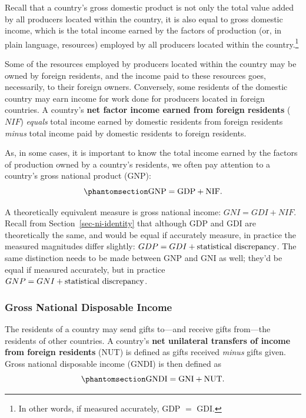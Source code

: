 \documentclass[
  letterpaper,
]{book}
\begin{document}

Recall that a country's gross domestic product is not only the total
value added by all producers located within the country, it is also
equal to gross domestic income, which is the total income earned by the
factors of production (or, in plain language, resources) employed by all
producers located within the country.\footnote{In other words, if
  measured accurately, GDP \(=\) GDI.}

Some of the resources employed by producers located within the country
may be owned by foreign residents, and the income paid to these
resources goes, necessarily, to their foreign owners. Conversely, some
residents of the domestic country may earn income for work done for
producers located in foreign countries. A country's \textbf{net factor
income earned from foreign residents} (\(NIF\)) \emph{equals} total
income earned by domestic residents from foreign residents \emph{minus}
total income paid by domestic residents to foreign residents.

As, in some cases, it is important to know the total income earned by
the factors of production owned by a country's residents, we often pay
attention to a country's gross national product (GNP):
\begin{equation}\phantomsection\label{eq-gnp}{
\hbox{GNP}=\hbox{GDP}+\hbox{NIF}.
}\end{equation}

A theoretically equivalent measure is gross national income:
\(GNI=GDI+NIF\). Recall from Section~\ref{sec-ni-identity} that although
GDP and GDI are theoretically the same, and would be equal if accurately
measure, in practice the measured magnitudes differ slightly:
\(GDP=GDI+\hbox{statistical discrepancy}\). The same distinction needs
to be made between GNP and GNI as well; they'd be equal if measured
accurately, but in practice \(GNP=GNI+\hbox{statistical discrepancy}\).

\subsubsection{Gross National Disposable Income}\label{sec-gndi}


The residents of a country may send gifts to---and receive gifts
from---the residents of other countries. A country's \textbf{net
unilateral transfers of income from foreign residents} (NUT) is defined
as gifts received \emph{minus} gifts given. Gross national disposable
income (GNDI) is then defined as
\begin{equation}\phantomsection\label{eq-gndi}{
\hbox{GNDI}=\hbox{GNI}+\hbox{NUT}.
}\end{equation}
\end{document}
